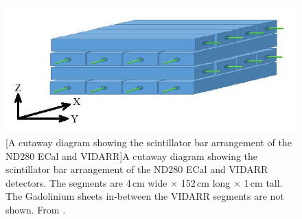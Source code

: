 \begin{figure}[!h]
\centering
  \centering
  \includegraphics[width=0.6\linewidth]{Chapter2/Figs/Raster/VIDARR_diagram.jpeg}
  [A cutaway diagram showing the scintillator bar arrangement of the ND280 ECal and VIDARR]{A cutaway diagram showing the scintillator bar arrangement of the ND280 ECal and VIDARR detectors. The segments are 4\,cm wide $\times$ 152\,cm long $\times$ 1\,cm tall. The Gadolinium sheets in-between the VIDARR segments are not shown. From \cite{GeorgeHoltDiagram}.}
  \label{fig:vidarrDiagram}
\end{figure}

